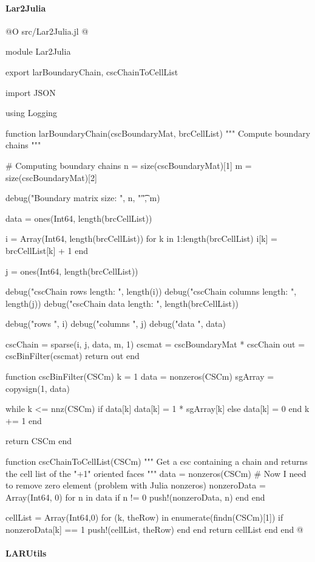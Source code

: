 \documentclass[11pt,oneside]{article}	%
\begin{document}
\paragraph{Lar2Julia}

@O src/Lar2Julia.jl
@{module Lar2Julia

export larBoundaryChain, cscChainToCellList

import JSON

using Logging

function larBoundaryChain(cscBoundaryMat, brcCellList)
  """
  Compute boundary chains
  """

  # Computing boundary chains
  n = size(cscBoundaryMat)[1]
  m = size(cscBoundaryMat)[2]

  debug("Boundary matrix size: ", n, "\t", m)

  data = ones(Int64, length(brcCellList))

  i = Array(Int64, length(brcCellList))
  for k in 1:length(brcCellList)
    i[k] = brcCellList[k] + 1
  end

  j = ones(Int64, length(brcCellList))

  debug("cscChain rows length: ", length(i))
  debug("cscChain columns length: ", length(j))
  debug("cscChain data length: ", length(brcCellList))

  debug("rows ", i)
  debug("columns ", j)
  debug("data ", data)

  cscChain = sparse(i, j, data, m, 1)
  cscmat = cscBoundaryMat * cscChain
  out = cscBinFilter(cscmat)
  return out
end

function cscBinFilter(CSCm)
  k = 1
  data = nonzeros(CSCm)
  sgArray = copysign(1, data)

  while k <= nnz(CSCm)
    if data[k] %
      data[k] = 1 * sgArray[k]
    else
      data[k] = 0
    end
    k += 1
  end

  return CSCm
end

function cscChainToCellList(CSCm)
  """
  Get a csc containing a chain and returns
  the cell list of the "+1" oriented faces
  """
  data = nonzeros(CSCm)
  # Now I need to remove zero element (problem with Julia nonzeros)
  nonzeroData = Array(Int64, 0)
  for n in data
    if n != 0
      push!(nonzeroData, n)
    end
  end

  cellList = Array(Int64,0)
  for (k, theRow) in enumerate(findn(CSCm)[1])
    if nonzeroData[k] == 1
      push!(cellList, theRow)
    end
  end
  return cellList
end
end
@}

\paragraph{LARUtils}
\end{document}
